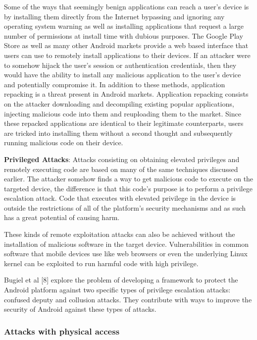 \documentclass[conference]{IEEEtran}
\begin{document}
Some of the ways that seemingly benign applications can reach a user's device is by installing them directly from the Internet bypassing and ignoring any operating system warning as well as installing applications that request a large number of permissions at install time with dubious purposes. The Google Play Store as well as many other Android markets provide a web based interface that users can use to remotely install applications to their devices. If an attacker were to somehow hijack the user's session or authentication credentials, then they would have the ability to install any malicious application to the user's device and potentially compromise it. In addition to these methods, application repacking is a threat present in Android markets. Application repacking consists on the attacker downloading and decompiling existing popular applications, injecting malicious code into them and reuploading them to the market. Since these repacked applications are identical to their legitimate counterparts, users are tricked into installing them without a second thought and subsequently running malicious code on their device.

\textbf{Privileged Attacks}: Attacks consisting on obtaining elevated privileges and remotely executing code are based on many of the same techniques discussed earlier. The attacker somehow finds a way to get malicious code to execute on the targeted device, the difference is that this code's purpose is to perform a privilege escalation attack. Code that executes with elevated privilege in the device is outside the restrictions of all of the platform's security mechanisms and as such has a great potential of causing harm.

These kinds of remote exploitation attacks can also be achieved without the installation of malicious software in the target device. Vulnerabilities in common software that mobile devices use like web browsers or even the underlying Linux kernel can be exploited to run harmful code with high privilege.

Bugiel et al [8] explore the problem of developing a framework to protect the Android platform against two specific types of privilege escalation attacks: confused deputy and collusion attacks. They contribute with ways to improve the security of Android against these types of attacks.

\subsubsection{Attacks with physical access}
\end{document}
